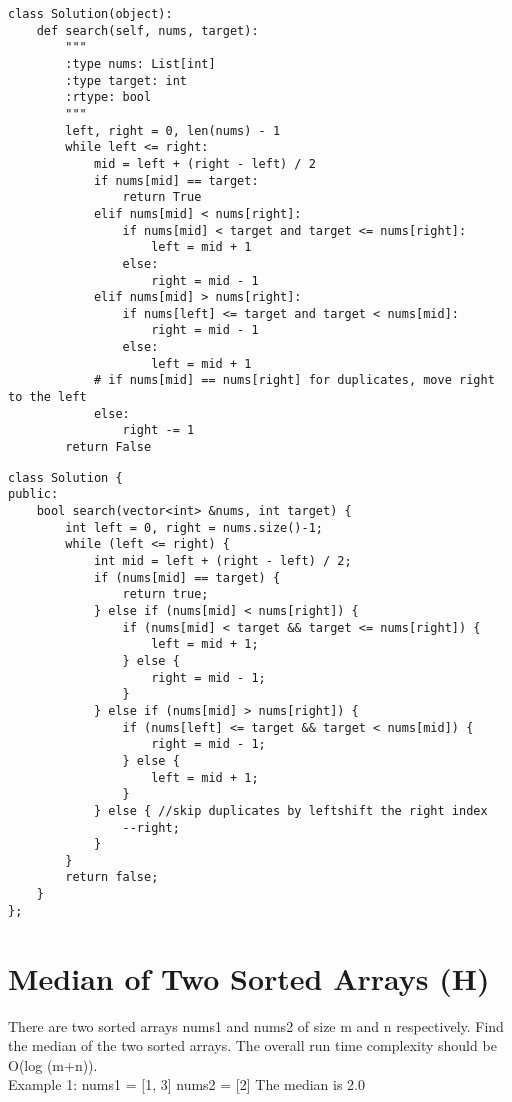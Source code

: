 \begin{lstlisting}
class Solution(object):
    def search(self, nums, target):
        """
        :type nums: List[int]
        :type target: int
        :rtype: bool
        """
        left, right = 0, len(nums) - 1
        while left <= right:
            mid = left + (right - left) / 2
            if nums[mid] == target:
                return True
            elif nums[mid] < nums[right]:
                if nums[mid] < target and target <= nums[right]:
                    left = mid + 1
                else:
                    right = mid - 1
            elif nums[mid] > nums[right]:
                if nums[left] <= target and target < nums[mid]:
                    right = mid - 1
                else:
                    left = mid + 1
            # if nums[mid] == nums[right] for duplicates, move right to the left
            else:
                right -= 1
        return False
\end{lstlisting}
        

\begin{lstlisting}
class Solution {
public:
    bool search(vector<int> &nums, int target) {
        int left = 0, right = nums.size()-1;
        while (left <= right) {
            int mid = left + (right - left) / 2;
            if (nums[mid] == target) {
                return true;
            } else if (nums[mid] < nums[right]) {
                if (nums[mid] < target && target <= nums[right]) {
                    left = mid + 1;
                } else {
                    right = mid - 1;
                }
            } else if (nums[mid] > nums[right]) {
                if (nums[left] <= target && target < nums[mid]) {
                    right = mid - 1;
                } else {
                    left = mid + 1;
                }
            } else { //skip duplicates by leftshift the right index
                --right;
            }
        }
        return false;
    }
};
\end{lstlisting}


\section{Median of Two Sorted Arrays (H)}
There are two sorted arrays nums1 and nums2 of size m and n respectively. Find the median of the two sorted arrays. The overall run time complexity should be O(log (m+n)).\\

Example 1:
nums1 = [1, 3]
nums2 = [2]
The median is 2.0\\

